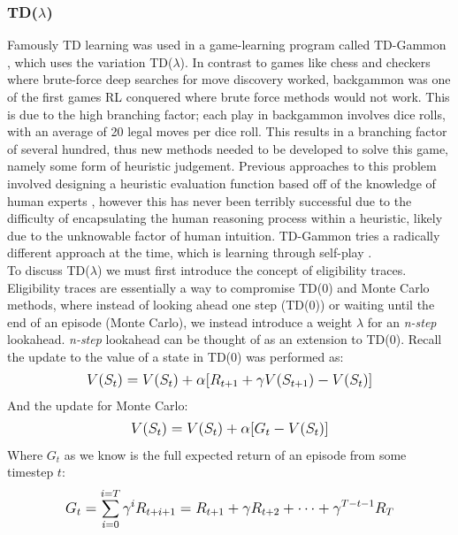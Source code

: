 \documentclass[12pt]{article}
\begin{document}
\subsubsection{\texorpdfstring{TD($\lambda$)}{Lg}}
Famously TD learning was used in a game-learning program called TD-Gammon \autocite{tesauro1995temporal}, which uses the variation TD($\lambda$). In contrast to games like chess and checkers where brute-force deep searches for move discovery worked, backgammon was one of the first games RL conquered where brute force methods would not work. This is due to the high branching factor; each play in backgammon involves dice rolls, with an average of 20 legal moves per dice roll. This results in a branching factor of several hundred, thus new methods needed to be developed to solve this game, namely some form of heuristic judgement. Previous approaches to this problem involved designing a heuristic evaluation function based off of the knowledge of human experts \autocite{berliner1980computer}, however this has never been terribly successful due to the difficulty of encapsulating the human reasoning process within a heuristic, likely due to the unknowable factor of human intuition. TD-Gammon tries a radically different approach at the time, which is learning through self-play \autocite{tesauro1995temporal}.
\\\newline To discuss TD($\lambda$) we must first introduce the concept of eligibility traces. Eligibility traces are essentially a way to compromise TD(0) and Monte Carlo methods, where instead of looking ahead one step (TD(0)) or waiting until the end of an episode (Monte Carlo), we instead introduce a weight $\lambda$ for an \textit{n-step} lookahead. \textit{n-step} lookahead can be thought of as an extension to TD(0). Recall the update to the value of a state in TD(0) was performed as: 
\begin{equation}
    \mathlarger{
        V(S_t) = V(S_t) + \alpha[R_{t+1}+ \gamma V(S_{t+1}) - V(S_t)]
    }
\end{equation}
And the update for Monte Carlo:
\begin{equation}
    \mathlarger{
        V(S_t) = V(S_t) + \alpha[G_t - V(S_t)]
    }
\end{equation}
Where $G_t$ as we know is the full expected return of an episode from some timestep $t$: 
\begin{equation}
    \mathlarger{
        G_t = \sum\limits_{i=0}^{i=T}\gamma^iR_{t+i+1} = R_{t+1} + \gamma R_{t+2} + \dots + \gamma^{T-t-1}R_T
    }
\end{equation}
\end{document}
